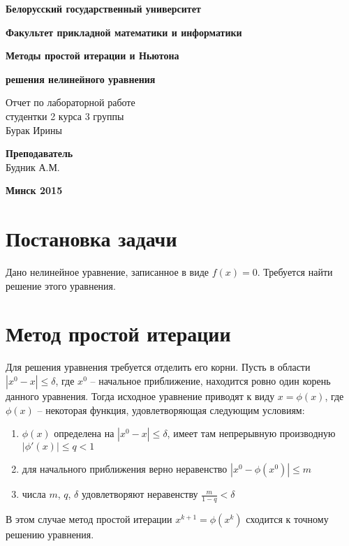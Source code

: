 \documentclass[12pt,a4paper]{article}
\begin{document}
	\begin{titlepage}
	
		\centerline{\large \bf Белорусский государственный университет}
		\centerline{\large \bf Факультет прикладной математики и информатики}
		\vfill
		\vfill
		\centerline{\Large \bf Методы простой итерации и Ньютона}
		\centerline{\Large \bf решения нелинейного уравнения}
		\bigskip
		\vfill
		\bigskip
		\vfill
		\begin{centering}
			{\large
				Отчет по лабораторной работе \\
				студентки 2 курса 3 группы \\
				Бурак Ирины \\
			}
		\end{centering}
		\vfill
		\vfill
		\hfill
		\begin{minipage}{0.25\textwidth}
			{\large{\bf Преподаватель} \\
				{Будник А.М.}}
		\end{minipage}
		\vfill
		\vfill
		\centerline{\Large \bf Минск 2015}
	\end{titlepage}
	\section{Постановка задачи}
	Дано нелинейное уравнение, записанное в виде $f(x) = 0$. Требуется найти решение этого уравнения.
	\section{Метод простой итерации}
	Для решения уравнения требуется отделить его корни. Пусть в области $|x^0 - x| \le \delta $, где $x^0$ -- начальное приближение, находится ровно один корень данного уравнения. Тогда исходное уравнение приводят к виду $x = \phi(x)$, где $\phi(x)$ -- некоторая функция, удовлетворяющая следующим условиям:
	\begin{enumerate}
		\item $\phi(x)$ определена на $|x^0 - x| \le \delta $, имеет там непрерывную производную $|\phi'(x)| \le q < 1$
		\item для начального приближения верно неравенство $|x^0 - \phi(x^0)| \le m$
		\item числа $m$, $q$, $\delta$ удовлетворяют неравенству $\frac{m}{1 - q} < \delta$
	\end{enumerate}
	В этом случае метод простой итерации $x^{k+1} = \phi(x^k)$ сходится к точному решению уравнения.
\end{document}
